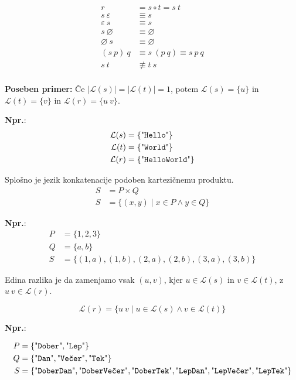 \documentclass{article}
\newcommand{\Ex}{\textbf{Npr.}:\ }
\newcommand{\Special}[1]{\textbf{#1}}
\newcommand{\Empty}{\varnothing}
\newcommand{\Null}{\varepsilon}
\newcommand{\Language}[1]{\mathcal{L}(#1)}
\newcommand{\Str}[1]{\text{\textquotedbl\texttt{#1}\textquotedbl}}
\newcommand{\Seq}{\ }
\begin{document}
\begin{align*}
  r &= s \circ t = s \Seq t \\
  s \Seq \Null &\equiv s \\
  \Null \Seq s &\equiv s   \\
  s \Seq \Empty &\equiv \Empty \\
  \Empty \Seq s &\equiv \Empty \\
  (s \Seq p) \Seq q &\equiv s \Seq (p \Seq q) \equiv s \Seq p \Seq q \\
  s \Seq t &\not\equiv t \Seq s\\
\end{align*}

\Special{Poseben primer:} Če $|\Language{s}| = |\Language{t}| = 1$, potem $\Language{s} = \{u\}$ in $\Language{t} = \{v\}$ in $\Language{r} = \{u \Seq v\}$.

\Ex
\begin{align*}
  \Language{s} &= \{\Str{Hello}\}\\
  \Language{t} &= \{\Str{World}\}\\
  \Language{r} &= \{\Str{HelloWorld}\}
\end{align*}

Splošno je jezik konkatenacije podoben kartezičnemu produktu.
\begin{align*}
  S &= P \times Q \\
  S &= \{ (x, y) \mid x \in P \land y \in Q\}
\end{align*}

\Ex
\begin{align*}
  P &= \{1, 2, 3\}\\
  Q &= \{a, b\}\\
  S &= \{(1, a), (1, b), (2, a), (2, b), (3, a), (3, b) \}
\end{align*}

Edina razlika je da zamenjamo vsak $(u, v)$, kjer $u \in \Language{s}$ in $v\in \Language{t}$, z $u \Seq v \in \Language{r}$.

\begin{equation*}
  \Language{r} = \{ u \Seq v \mid u \in \Language{s} \land v \in \Language{t}\}
\end{equation*}

\Ex

\begin{align*}
  P &= \{\Str{Dober}, \Str{Lep}\}\\
  Q &= \{\Str{Dan}, \Str{Večer}, \Str{Tek}\}\\
  S &= \{\Str{DoberDan}, \Str{DoberVečer}, \Str{DoberTek}, \Str{LepDan}, \Str{LepVečer}, \Str{LepTek} \}
\end{align*}
\end{document}
